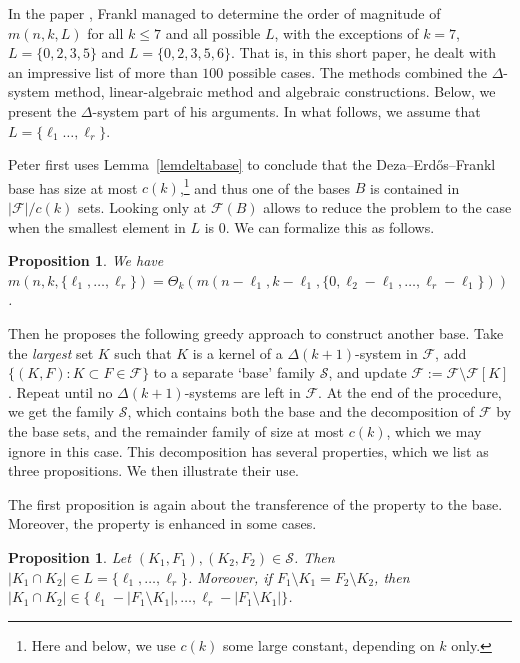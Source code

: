 \documentclass[graybox]{svmult}
\renewcommand{\le}{\leqslant}
\newcommand{\ff}{\mathcal{F}}
\newcommand{\m}{\mathcal}
\newtheorem{prop}[thm]{Proposition}
\begin{document}
In the paper \cite{Fra80b}, Frankl managed to determine the order of magnitude of $m(n,k,L)$ for all $k\le 7$ and all possible $L$, with the exceptions of $k=7$, $L=\{0,2,3,5\}$ and $L=\{0,2,3,5,6\}$. That is, in this short paper, he dealt with an impressive list of more than $100$ possible cases. The methods combined the $\Delta$-system method, linear-algebraic method and algebraic constructions. Below, we present the $\Delta$-system part of his arguments. In what follows, we assume that $L = \{\ell_1\ldots, \ell_r\}$.


Peter first uses Lemma~\ref{lemdeltabase} to conclude that the Deza--Erd\H os--Frankl base has size at most $c(k)$,\footnote{Here and below, we use $c(k)$ some large constant, depending on $k$ only.} and thus one of the bases $B$ is contained in $|\ff|/c(k)$ sets. Looking only at $\ff(B)$ allows to reduce the problem to the case when the smallest element in $L$ is $0$. We can formalize this as follows.
\begin{prop}\label{propfra}
  We have $m(n,k,\{\ell_1,\ldots, \ell_r\}) = \Theta_k(m(n-\ell_1,k-\ell_1,\{0,\ell_2-\ell_1,\ldots, \ell_r-\ell_1\}))$.
\end{prop}


 Then he proposes the following greedy approach to construct another base.  Take the {\it largest} set $K$ such that $K$ is a kernel of a $\Delta(k+1)$-system in $\ff$, add $\{(K,F):K\subset F\in \ff\}$ to a separate `base' family $\m S$, and update $\ff:=\ff\setminus \ff[K]$. Repeat until no $\Delta(k+1)$-systems are left in $\ff$. At the end of the procedure, we get the family $\m S$, which contains both the base and the decomposition of $\ff$ by the base sets, and the remainder family of size at most $c(k)$, which we may ignore in this case. This decomposition has several properties, which we list as three propositions. We then illustrate their use.









The first proposition is again about the transference of the property to the base. Moreover, the property is  enhanced in some cases.

\begin{prop}\label{prop77b}
  Let $(K_1,F_1),(K_2,F_2)\in \m S$. Then $|K_1\cap K_2|\in L=\{\ell_1,\ldots, \ell_r\}$. Moreover, if $F_1\setminus K_1 = F_2\setminus K_2$, then $|K_1\cap K_2|\in \{\ell_1-|F_1\setminus K_1|,\ldots, \ell_r-|F_1\setminus K_1|\}$.
\end{prop}
\end{document}
